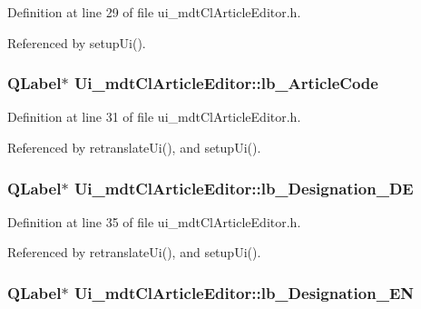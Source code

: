 Definition at line 29 of file ui\-\_\-mdt\-Cl\-Article\-Editor.\-h.



Referenced by setup\-Ui().

\hypertarget{class_ui__mdt_cl_article_editor_ad15cc17ca97f99ceee28014df93d9351}{
\subsubsection[{lb\-\_\-\-Article\-Code}]{\setlength{\rightskip}{0pt plus 5cm}Q\-Label$\ast$ Ui\-\_\-mdt\-Cl\-Article\-Editor\-::lb\-\_\-\-Article\-Code}}\label{class_ui__mdt_cl_article_editor_ad15cc17ca97f99ceee28014df93d9351}


Definition at line 31 of file ui\-\_\-mdt\-Cl\-Article\-Editor.\-h.



Referenced by retranslate\-Ui(), and setup\-Ui().

\hypertarget{class_ui__mdt_cl_article_editor_a15ba92a35d2377a4e03ac6de7fcb79b9}{
\subsubsection[{lb\-\_\-\-Designation\-\_\-\-D\-E}]{\setlength{\rightskip}{0pt plus 5cm}Q\-Label$\ast$ Ui\-\_\-mdt\-Cl\-Article\-Editor\-::lb\-\_\-\-Designation\-\_\-\-D\-E}}\label{class_ui__mdt_cl_article_editor_a15ba92a35d2377a4e03ac6de7fcb79b9}


Definition at line 35 of file ui\-\_\-mdt\-Cl\-Article\-Editor.\-h.



Referenced by retranslate\-Ui(), and setup\-Ui().

\hypertarget{class_ui__mdt_cl_article_editor_a51e4014d2917fd83c31b92e2b66298aa}{
\subsubsection[{lb\-\_\-\-Designation\-\_\-\-E\-N}]{\setlength{\rightskip}{0pt plus 5cm}Q\-Label$\ast$ Ui\-\_\-mdt\-Cl\-Article\-Editor\-::lb\-\_\-\-Designation\-\_\-\-E\-N}}\label{class_ui__mdt_cl_article_editor_a51e4014d2917fd83c31b92e2b66298aa}


